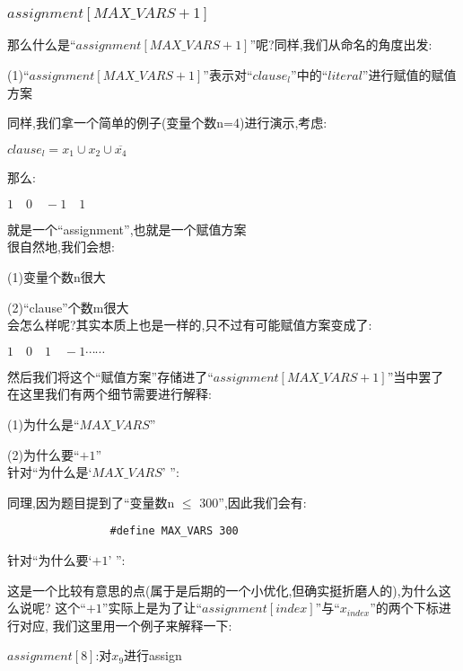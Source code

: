         \subsubsection{$assignment[MAX\_VARS+1]$}
        那么什么是``$assignment[MAX\_VARS+1]$''呢?同样,我们从命名的角度出发:\par
        (1)``$assignment[MAX\_VARS+1]$''表示对``$clause_{l}$''中的``$literal$''进行赋值的赋值方案\par
        同样,我们拿一个简单的例子(变量个数n=4)进行演示,考虑:
        \begin{center}
            $clause_{l} = x_{1} \cup x_{2} \cup \overline{x_{4}}$
        \end{center}
        \par
        那么:
        \begin{center}
            $1 \quad 0 \quad -1 \quad 1$
        \end{center}
        \par
        就是一个``assignment'',也就是一个赋值方案\\
        很自然地,我们会想:\par
        (1)变量个数n很大\par
        (2)``clause''个数m很大\\
        会怎么样呢?其实本质上也是一样的,只不过有可能赋值方案变成了:
        \begin{center}
            $1 \quad 0 \quad 1 \quad -1 \cdots \cdots$
        \end{center}
        然后我们将这个``赋值方案''存储进了``$assignment[MAX\_VARS+1]$''当中罢了\\
        在这里我们有两个细节需要进行解释:\par
        (1)为什么是``$MAX\_VARS$''\par
        (2)为什么要``$+1$''\\
        针对``为什么是`$MAX\_VARS$' '':\par
            同理,因为题目提到了``变量数n $\leq$ 300'',因此我们会有:
        \begin{lstlisting}
                #define MAX_VARS 300
        \end{lstlisting}
        针对``为什么要`$+1$' '':\par
        这是一个比较有意思的点(属于是后期的一个小优化,但确实挺折磨人的),为什么这么说呢?
        这个``$+1$''实际上是为了让``$assignment[index]$''与``$x_{index}$''的两个下标进行对应,
        我们这里用一个例子来解释一下:
        \begin{center}
            $assignment[8]$:对$x_{9}$进行assign
        \end{center}
